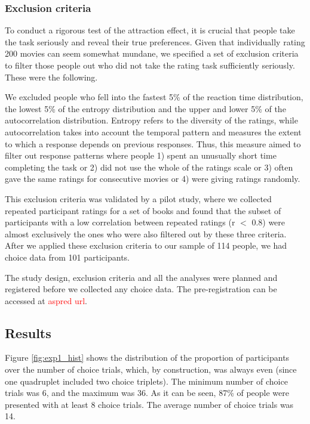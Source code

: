 \documentclass[11pt,a4paper]{article}
\begin{document}
 
 


\subsubsection{Exclusion criteria} \label{exclusion_ref}

To conduct a rigorous test of the attraction effect, it is crucial that people take the task seriously and reveal their true preferences. Given that individually rating 200 movies can seem somewhat mundane, we specified a set of exclusion criteria to filter those people out who did not take the rating task sufficiently seriously. These were the following. 

We excluded people who fell into the fastest 5\% of the reaction time distribution, the lowest 5\% of the entropy distribution and the upper and lower 5\% of the autocorrelation distribution. Entropy refers to the diversity of the ratings, while autocorrelation takes into account the temporal pattern and measures the extent to which a response depends on previous responses. Thus, this measure aimed to filter out response patterns where people 1) spent an unusually short time completing the task or 2) did not use the whole of the ratings scale or 3) often gave the same ratings for consecutive movies or 4) were giving ratings randomly.

This exclusion criteria was validated by a pilot study, where we collected repeated participant ratings for a set of books and found that the subset of participants with a low correlation between repeated ratings (r $<$ 0.8) were almost exclusively the ones who were also filtered out by these three criteria. After we applied these exclusion criteria to our sample of 114 people, we had choice data from 101 participants.

The study design, exclusion criteria and all the analyses were planned and registered before we collected any choice data. The pre-registration can be accessed at \textcolor{red}{aspred url}. 


\subsection{Results}

Figure \ref{fig:exp1_hist} shows the distribution of the proportion of participants over the number of choice trials, which, by construction, was always even (since one quadruplet included two choice triplets). The minimum number of choice trials was 6, and the maximum was 36. As it can be seen, 87\% of people were presented with at least 8 choice trials. The average number of choice trials was 14.
\end{document}
